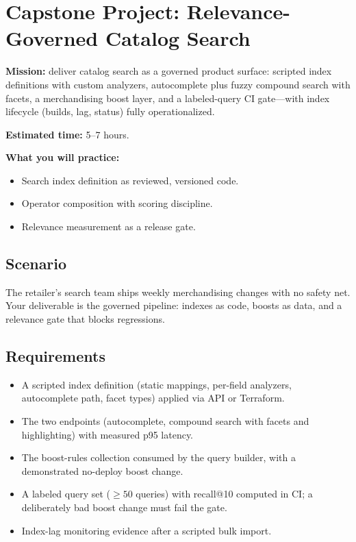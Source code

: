\section{Capstone Project: Relevance-Governed Catalog Search}\label{sec:ch13-capstone}

\begin{capstonebox}
\textbf{Mission:} deliver catalog search as a governed product surface: scripted index definitions with custom analyzers, autocomplete plus fuzzy compound search with facets, a merchandising boost layer, and a labeled-query CI gate---with index lifecycle (builds, lag, status) fully operationalized.

\textbf{Estimated time:} 5--7 hours.

\textbf{What you will practice:}
\begin{itemize}
    \item Search index definition as reviewed, versioned code.
    \item Operator composition with scoring discipline.
    \item Relevance measurement as a release gate.
\end{itemize}
\end{capstonebox}

\subsection*{Scenario}
The retailer's search team ships weekly merchandising changes with no safety net. Your deliverable is the governed pipeline: indexes as code, boosts as data, and a relevance gate that blocks regressions.

\subsection*{Requirements}
\begin{itemize}
    \item A scripted index definition (static mappings, per-field analyzers, autocomplete path, facet types) applied via API or Terraform.
    \item The two endpoints (autocomplete, compound search with facets and highlighting) with measured p95 latency.
    \item The boost-rules collection consumed by the query builder, with a demonstrated no-deploy boost change.
    \item A labeled query set (${\geq}50$ queries) with recall@10 computed in CI; a deliberately bad boost change must fail the gate.
    \item Index-lag monitoring evidence after a scripted bulk import.
\end{itemize}


